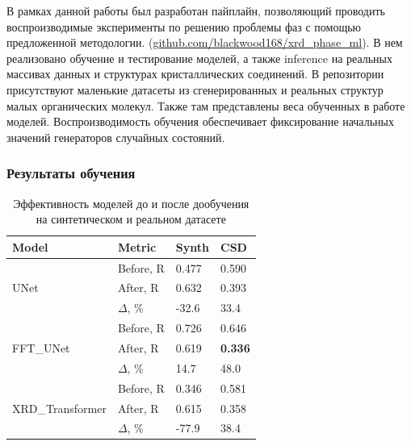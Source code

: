 \documentclass[a4paper,12pt]{article}
\begin{document}
{%


В рамках данной работы был разработан пайплайн, позволяющий проводить воспроизводимые эксперименты по решению проблемы фаз с помощью предложенной методологии. (\url{github.com/blackwood168/xrd_phase_ml}). В нем реализовано обучение и тестирование моделей, а также inference на реальных массивах данных и структурах кристаллических соединений. В репозитории присутствуют маленькие датасеты из сгенерированных и реальных структур малых органических молекул. Также там представлены веса обученных в работе моделей. Воспроизводимость обучения обеспечивает фиксирование начальных значений генераторов случайных состояний.

\subsubsection*{Результаты обучения}

\begin{table}[H]
\caption{Эффективность моделей до и после дообучения на синтетическом и реальном датасете}
\label{doposle}
\centering
\footnotesize
\begin{tabular}{|l|l|l|l|} 
\hline
\textbf{Model} & \textbf{Metric} & \textbf{Synth} & \textbf{CSD}  \\ 
\hline
\multirow{3}{*}{UNet} 
& Before, R & 0.477 & 0.590 \\ 
& After, R  & 0.632 & 0.393 \\ 
& $\Delta$, \%       & -32.6 & 33.4  \\
\hline
\multirow{3}{*}{FFT\_UNet}
& Before, R & 0.726 & 0.646 \\ 
& After, R  & 0.619 & \textbf{0.336} \\ 
& $\Delta$, \%       & 14.7  & 48.0  \\
\hline
\multirow{3}{*}{XRD\_Transformer}
& Before, R & 0.346 & 0.581 \\ 
& After, R  & 0.615 & 0.358 \\ 
& $\Delta$, \%       & -77.9 & 38.4  \\
\hline
\end{tabular}
\end{table}

}
\end{document}
